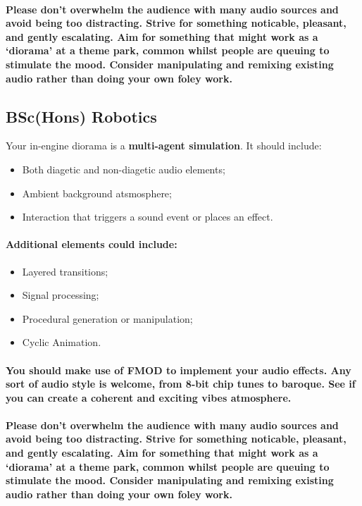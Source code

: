 \documentclass{../../fal_assignment}
\begin{document}
\paragraph{Please don’t overwhelm the audience with many audio sources and avoid being too distracting. Strive for something noticable, pleasant, and gently escalating. Aim for something that might work as a ‘diorama’ at a theme park, common whilst people are queuing to stimulate the mood. Consider manipulating and remixing existing audio rather than doing your own foley work.}

\subsection*{BSc(Hons) Robotics}

Your in-engine diorama is a \textbf{multi-agent simulation}. It should include:
\begin{itemize}
\item Both diagetic and non-diagetic audio elements;
\item Ambient background atsmosphere; 
\item Interaction that triggers a sound event or places an effect.
\end{itemize}
\paragraph{Additional elements could include:}
\begin{itemize}
\item Layered transitions;
\item Signal processing;
\item Procedural generation or manipulation; 
\item Cyclic Animation.
\end{itemize}
\paragraph{You should make use of FMOD to implement your audio effects. Any sort of audio style is welcome, from 8-bit chip tunes to baroque. See if you can create a coherent and exciting vibes atmosphere.}

\paragraph{Please don’t overwhelm the audience with many audio sources and avoid being too distracting. Strive for something noticable, pleasant, and gently escalating. Aim for something that might work as a ‘diorama’ at a theme park, common whilst people are queuing to stimulate the mood. Consider manipulating and remixing existing audio rather than doing your own foley work.}
\end{document}
